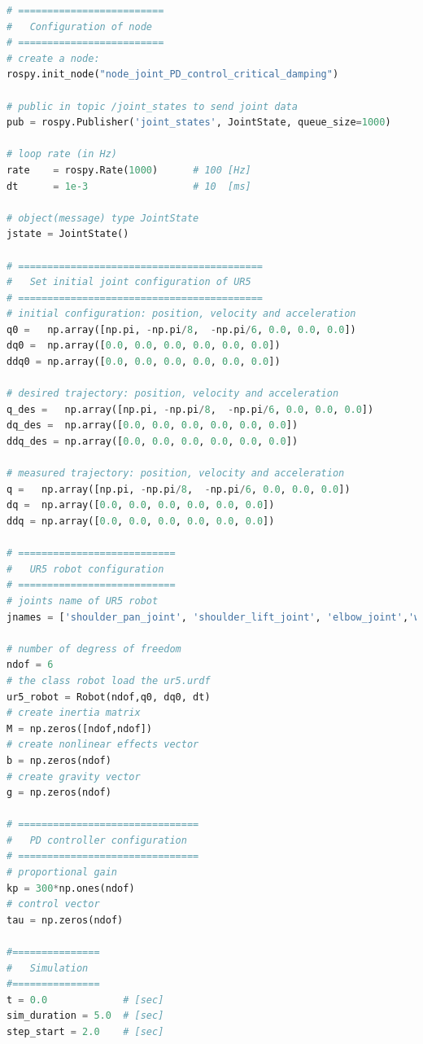 \begin{lstlisting}[language=Python,caption={Move the second and fifth joint of UR5 robot with the requirement motion of activity 1.5.1}, label={lst:joint_PD_control_critical_damping}]
# =========================
#   Configuration of node
# =========================
# create a node: 
rospy.init_node("node_joint_PD_control_critical_damping")

# public in topic /joint_states	to send joint data	
pub = rospy.Publisher('joint_states', JointState, queue_size=1000)

# loop rate (in Hz)
rate 	= rospy.Rate(1000)		# 100 [Hz]
dt 		= 1e-3					# 10  [ms]

# object(message) type JointState
jstate = JointState()

# ==========================================
#   Set initial joint configuration of UR5
# ==========================================
# initial configuration: position, velocity and acceleration 
q0 =   np.array([np.pi, -np.pi/8,  -np.pi/6, 0.0, 0.0, 0.0])
dq0 =  np.array([0.0, 0.0, 0.0, 0.0, 0.0, 0.0]) 
ddq0 = np.array([0.0, 0.0, 0.0, 0.0, 0.0, 0.0]) 

# desired trajectory: position, velocity and acceleration
q_des =   np.array([np.pi, -np.pi/8,  -np.pi/6, 0.0, 0.0, 0.0]) 
dq_des =  np.array([0.0, 0.0, 0.0, 0.0, 0.0, 0.0]) 
ddq_des = np.array([0.0, 0.0, 0.0, 0.0, 0.0, 0.0]) 

# measured trajectory: position, velocity and acceleration
q =   np.array([np.pi, -np.pi/8,  -np.pi/6, 0.0, 0.0, 0.0])
dq =  np.array([0.0, 0.0, 0.0, 0.0, 0.0, 0.0]) 
ddq = np.array([0.0, 0.0, 0.0, 0.0, 0.0, 0.0]) 

# ===========================
#   UR5 robot configuration
# ===========================
# joints name of UR5 robot
jnames = ['shoulder_pan_joint', 'shoulder_lift_joint', 'elbow_joint','wrist_1_joint', 'wrist_2_joint', 'wrist_3_joint']

# number of degress of freedom
ndof = 6
# the class robot load the ur5.urdf
ur5_robot = Robot(ndof,q0, dq0, dt)
# create inertia matrix 
M = np.zeros([ndof,ndof])
# create nonlinear effects vector
b = np.zeros(ndof)
# create gravity vector
g = np.zeros(ndof)

# ===============================
#   PD controller configuration
# ===============================
# proportional gain
kp = 300*np.ones(ndof)
# control vector
tau = np.zeros(ndof)    

#===============
#   Simulation
#===============
t = 0.0             # [sec] 
sim_duration = 5.0  # [sec]
step_start = 2.0    # [sec]


\end{lstlisting}
